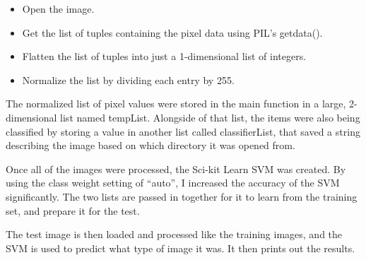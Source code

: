 \documentclass{article}
\begin{document}
\begin{itemize}
\item Open the image.
\item Get the list of tuples containing the pixel data using PIL’s getdata().
\item Flatten the list of tuples into just a 1-dimensional list of integers.
\item Normalize the list by dividing each entry by 255.
\end{itemize}

The normalized list of pixel values were stored in the main function in a large, 2-dimensional list named tempList. Alongside of that list, the items were also being classified by storing a value in another list called classifierList, that saved a string describing the image based on which directory it was opened from.



Once all of the images were processed, the Sci-kit Learn SVM was created. By using the class weight setting of “auto”, I increased the accuracy of the SVM significantly. The two lists are passed in together for it to learn from the training set, and prepare it for the test. 

The test image is then loaded and processed like the training images, and the SVM is used to predict what type of image it was. It then prints out the results.
\end{document}
